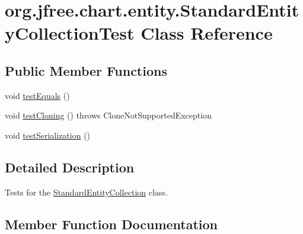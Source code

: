 \hypertarget{classorg_1_1jfree_1_1chart_1_1entity_1_1_standard_entity_collection_test}{}\section{org.\+jfree.\+chart.\+entity.\+Standard\+Entity\+Collection\+Test Class Reference}
\label{classorg_1_1jfree_1_1chart_1_1entity_1_1_standard_entity_collection_test}
\subsection*{Public Member Functions}
\begin{DoxyCompactItemize}
\item 
void \mbox{\hyperlink{classorg_1_1jfree_1_1chart_1_1entity_1_1_standard_entity_collection_test_adbc94624b94c54a8952b6393f69616be}{test\+Equals}} ()
\item 
void \mbox{\hyperlink{classorg_1_1jfree_1_1chart_1_1entity_1_1_standard_entity_collection_test_a6fcca5ac3f4b92508da81f70be297f84}{test\+Cloning}} ()  throws Clone\+Not\+Supported\+Exception 
\item 
void \mbox{\hyperlink{classorg_1_1jfree_1_1chart_1_1entity_1_1_standard_entity_collection_test_a5345085299e067629e3028a2481d9bce}{test\+Serialization}} ()
\end{DoxyCompactItemize}


\subsection{Detailed Description}
Tests for the \mbox{\hyperlink{classorg_1_1jfree_1_1chart_1_1entity_1_1_standard_entity_collection}{Standard\+Entity\+Collection}} class. 

\subsection{Member Function Documentation}
\mbox{\label{classorg_1_1jfree_1_1chart_1_1entity_1_1_standard_entity_collection_test_a6fcca5ac3f4b92508da81f70be297f84}} 
